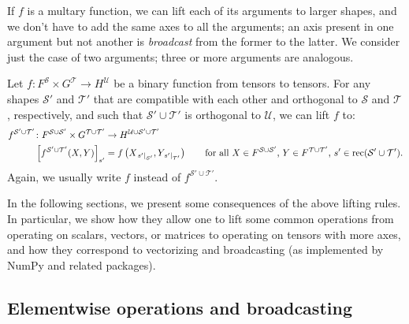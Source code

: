 If $f$ is a multary function, we can lift each of its arguments to larger shapes, and we don't have to add the same axes to all the arguments; an axis present in one argument but not another is \emph{broadcast} from the former to the latter. We consider just the case of two arguments; three or more arguments are analogous. 
\begin{definition} \label{def:lifting2}
Let $f \colon F^{\mathcal{S}} \times G^{\mathcal{T}} \rightarrow H^{\mathcal{U}}$ be a binary function from tensors to tensors. For any shapes $\mathcal{S'}$ and $\mathcal{T'}$ that are compatible with each other and orthogonal to $\mathcal{S}$ and $\mathcal{T}$, respectively, and such that $\mathcal{S'} \cup \mathcal{T'}$ is orthogonal to $\mathcal{U}$, we can lift $f$ to:
\begin{align*}
f^{\mathcal{S'} \cup \mathcal{T'}} \colon F^{\mathcal{S} \cup \mathcal{S'}} \times G^{\mathcal{T} \cup \mathcal{T'}} &\rightarrow H^{\mathcal{U} \cup \mathcal{S'} \cup \mathcal{T'}} \\
  \left[f^{\mathcal{S'} \cup \mathcal{T'}}(X,Y)\right]_{s'} &= f\left(X_{\mathopen{}\left.s'\right|_{\mathcal{S'}}},Y_{\mathopen{}\left.s'\right|_{\mathcal{T'}}}\right) \qquad \text{for all $X \in F^{\mathcal{S} \cup \mathcal{S'}}$, $Y \in F^{\mathcal{T} \cup \mathcal{T'}}$, $s' \in \operatorname{rec} (\mathcal{S'} \cup \mathcal{T'})$.}
\end{align*}
Again, we usually write $f$ instead of $f^{\mathcal{S'} \cup \mathcal{T'}}$.
\end{definition}

In the following sections, we present some consequences of the above lifting rules. In particular, we show how they allow one to lift some common operations from operating on scalars, vectors, or matrices to operating on tensors with more axes, and how they correspond to vectorizing and broadcasting (as implemented by NumPy and related packages).

\subsection{Elementwise operations and broadcasting}


